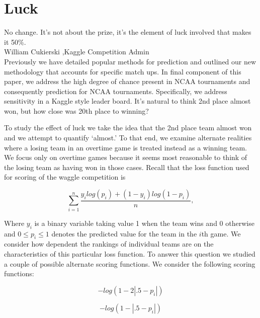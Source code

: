 
\section{Luck}
\noindent No change. It's not about the prize, it's the element of luck involved that makes it 50\%.\\
\noindent  William Cukierski ,Kaggle Competition Admin \\

Previously we have detailed popular methods for prediction and outlined our new methodology that accounts for specific match ups. In final component of this paper, we address the high degree of chance present in NCAA tournaments and consequently prediction for NCAA tournaments.  Specifically, we address sensitivity in a Kaggle style leader board. It's natural to think 2nd place almost won, but how close was 20th place to winning? 


To study the effect of luck we take the idea that the 2nd place team almost won and we attempt to quantify `almost.' To that end, we examine alternate realities where a losing team in an overtime game is treated instead as a winning team. We focus only on overtime games because it seems most reasonable to think of the losing team as having won in those cases. Recall that the loss function used for scoring of the waggle competition is

\begin{equation}
\sum_{i=1}^n\frac{y_ilog(p_i)+ (1-y_i)log(1-p_i)}{n},
\end{equation}

Where $y_i$ is a binary variable taking value 1 when the team wins and 0 otherwise and $0 \leq p_i \leq 1$ denotes the predicted value for the team in the $i$th game. We consider how dependent the rankings of individual teams are on the characteristics of this particular loss function. To answer this question we studied a couple of possible alternate scoring functions. We consider the following scoring functions: 
 
\begin{equation}\label{eqn:first_score_function}
-log(1-2|.5-p_i|)
\end{equation} 

\begin{equation}\label{eqn:second_score_function}
-log(1-|.5-p_i|)
\end{equation} 

